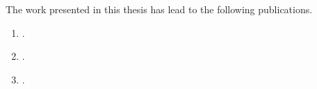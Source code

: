The work presented in this thesis has lead to the following publications. 


\begin{enumerate}
    \item {}. 
    \item {}.
    \item {}.
\end{enumerate}

